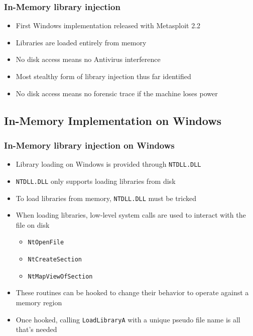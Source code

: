 \documentclass{beamer}
\newenvironment{sitemize}{\vspace{1mm}\begin{itemize}\itemsep 4pt\small}{\end{itemize}}
\begin{document}
\begin{frame}[t]
    \frametitle{In-Memory library injection}

    \begin{sitemize}
        \item First Windows implementation released with Metasploit 2.2

        \pause
        \item Libraries are loaded entirely from memory

        \pause
        \item No disk access means no Antivirus interference

        \pause
        \item Most stealthy form of library injection thus far
        identified

        \pause
        \item No disk access means no forensic trace if the machine
        loses power
    \end{sitemize}
\end{frame}

\subsection{In-Memory Implementation on Windows}

\begin{frame}[t]
    \frametitle{In-Memory library injection on Windows}

    \begin{sitemize}
        \item Library loading on Windows is provided through \texttt{NTDLL.DLL}
        \item \texttt{NTDLL.DLL} only supports loading libraries from disk
    \end{sitemize}

    \pause
    \begin{sitemize}
        \item To load libraries from memory, \texttt{NTDLL.DLL} must be tricked

        \pause
        \item When loading libraries, low-level system calls are used to interact with the file on disk
        \begin{sitemize}
            \item \texttt{NtOpenFile}
            \item \texttt{NtCreateSection}
            \item \texttt{NtMapViewOfSection}
        \end{sitemize}
        \item These routines can be hooked to change their behavior to operate against a memory region
    \end{sitemize}

    \pause
    \begin{sitemize}
        \item Once hooked, calling \texttt{LoadLibraryA} with a unique pseudo file name is all that's needed
    \end{sitemize}
\end{frame}
\end{document}
